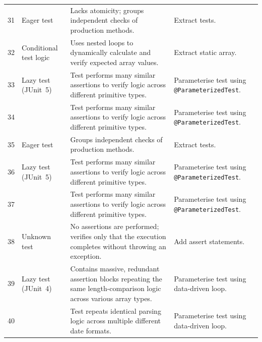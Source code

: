 \begin{xltabular}{\linewidth}{r l X l}
    31 & Eager test & Lacks atomicity; groups independent checks of production methods. & Extract tests. \\
    32 & Conditional test logic & Uses nested loops to dynamically calculate and verify expected array values. & Extract static array. \\
    33 & Lazy test (JUnit~5) & Test performs many similar assertions to verify logic across different primitive types. & Parameterise test using \texttt{@ParameterizedTest}. \\
    34 & & Test performs many similar assertions to verify logic across different primitive types. & Parameterise test using \texttt{@ParameterizedTest}. \\
    35 & Eager test & Groups independent checks of production methods. & Extract tests. \\
    36 & Lazy test (JUnit~5) & Test performs many similar assertions to verify logic across different primitive types. & Parameterise test using \texttt{@ParameterizedTest}. \\
    37 & & Test performs many similar assertions to verify logic across different primitive types. & Parameterise test using \texttt{@ParameterizedTest}. \\
    38 & Unknown test & No assertions are performed; verifies only that the execution completes without throwing an exception. & Add assert statements. \\
    39 & Lazy test (JUnit~4) & Contains massive, redundant assertion blocks repeating the same length-comparison logic across various array types. & Parameterise test using data-driven loop. \\
    40 & & Test repeats identical parsing logic across multiple different date formats. & Parameterise test using data-driven loop. \\

    \bottomrule
  \end{xltabular}
